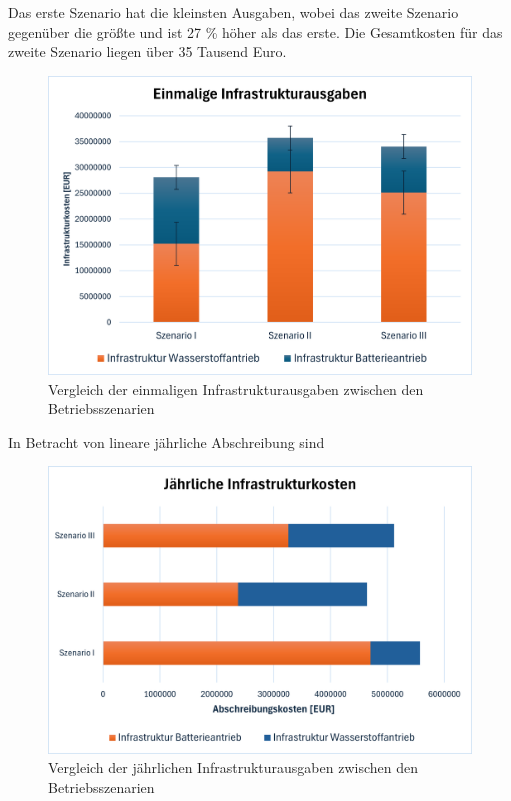 Das erste Szenario hat die kleinsten Ausgaben, wobei das zweite Szenario gegenüber die größte und ist 27 \% höher als das erste.
Die Gesamtkosten für das zweite Szenario liegen über 35 Tausend Euro.
\begin{figure}[h]
	\centering
	\includegraphics[width=0.8\linewidth]{Bilder/Infr_Szenarien.png}
	\caption[Vergleich der einmaligen Infrastrukturausgaben zwischen den Betriebsszenarien]{Vergleich der einmaligen Infrastrukturausgaben zwischen den Betriebsszenarien}
	\label{res_betriebsszenarien}
\end{figure}

In Betracht von lineare jährliche Abschreibung sind 
\begin{figure}[h]
	\centering
	\includegraphics[width=0.8\linewidth]{Bilder/infr_abschreibung.png}
	\caption[Vergleich der jährlichen Infrastrukturausgaben zwischen den Betriebsszenarien]{Vergleich der jährlichen Infrastrukturausgaben zwischen den Betriebsszenarien}
	\label{res_betriebsszenarien}
\end{figure}

